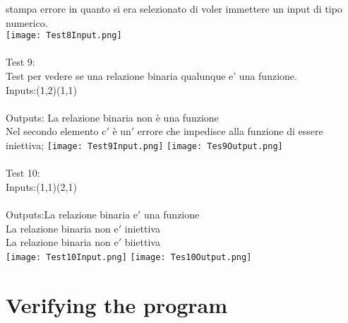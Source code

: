 \documentclass[11pt, a4paper, titlepage, block]{article}
\begin{document}
	stampa errore in quanto si era selezionato di voler immettere un input di tipo numerico.\\
	\texttt{[image: Test8Input.png]}
	\\
	\\
	\newpage
	Test 9:\\
	Test per vedere se una relazione binaria qualunque e' una funzione.\\
	Inputs:(1,2)(1,1)\\
	\\
	Outputs: La relazione binaria non \`e una funzione\\
	Nel secondo elemento c$'$ \`e un$'$ errore che impedisce alla funzione di essere iniettiva;
	\texttt{[image: Test9Input.png]}
	\texttt{[image: Tes9Output.png]}
	\\
	\\
	Test 10:\\
	Inputs:(1,1)(2,1)\\
	\\
	Outputs:La relazione binaria e$'$  una funzione\\
	La relazione binaria non e$'$  iniettiva\\
	La relazione binaria non e$'$  biiettiva\\
	\texttt{[image: Test10Input.png]}
	\texttt{[image: Tes10Output.png]}
	\newpage
	\section{Verifying the program}
	
	
	
	
	
	
\end{document}
